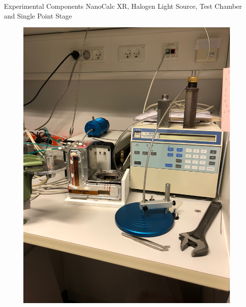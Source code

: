 \documentclass[10pt]{beamer}
\begin{document}
\begin{frame}{Experimental Components}
NanoCalc XR, Halogen Light Source, Test Chamber and Single Point Stage
		
\begin{minipage}{0.47\textwidth}
\begin{figure}
\includegraphics[scale=0.04,angle=-90]{setup1.JPG}
\end{figure}
\end{minipage}
\begin{minipage}{0.5\textwidth}
\begin{figure}

\end{figure}
\end{minipage}
\end{frame}
\end{document}
